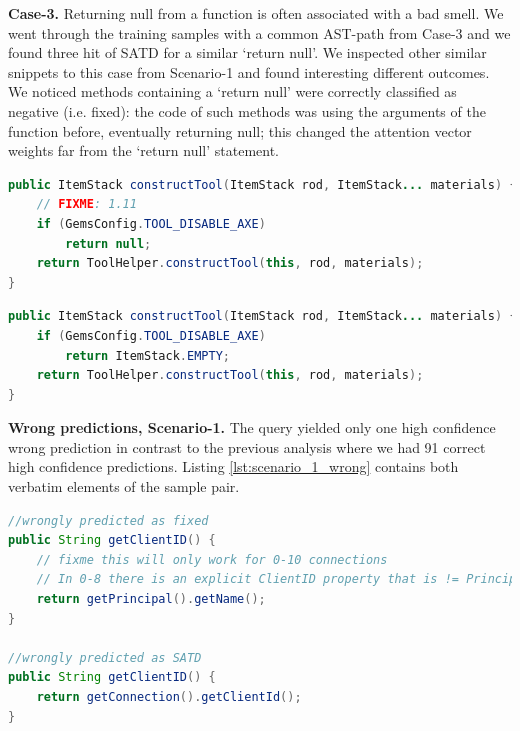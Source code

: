 \textbf{Case-3.} Returning null from a function is often associated with a bad smell. We went through the training samples with a common AST-path from Case-3 and we found three hit of SATD for a similar `return null'. We inspected other similar snippets to this case from Scenario-1 and found interesting different outcomes. We noticed methods containing a `return null' were correctly classified as negative (i.e. fixed): the code of such methods was using the arguments of the function before, eventually returning null; this changed the attention vector weights far from the `return null' statement. 


\begin{lstlisting}[caption={Case-3 SATD, verbatim source code}, label={lst:case3satd},language=Java]
public ItemStack constructTool(ItemStack rod, ItemStack... materials) {
    // FIXME: 1.11
    if (GemsConfig.TOOL_DISABLE_AXE)
        return null;
    return ToolHelper.constructTool(this, rod, materials);
}
\end{lstlisting}

\begin{lstlisting}[caption={Case-3 fixed, verbatim source code}, label={lst:case3fixed},language=Java]
public ItemStack constructTool(ItemStack rod, ItemStack... materials) {
    if (GemsConfig.TOOL_DISABLE_AXE)
        return ItemStack.EMPTY;
    return ToolHelper.constructTool(this, rod, materials);
}
\end{lstlisting}

\textbf{Wrong predictions, Scenario-1.}
The query yielded only one %
high confidence wrong prediction in contrast to the previous analysis where we had 91 correct high confidence predictions. Listing \ref{lst:scenario_1_wrong} contains both verbatim elements of the sample pair.


\begin{lstlisting}[caption={Scenario-1 wrong predictions, verbatim source code}, label={lst:scenario_1_wrong},language=Java]
//wrongly predicted as fixed
public String getClientID() {
    // fixme this will only work for 0-10 connections
    // In 0-8 there is an explicit ClientID property that is != Principal.
    return getPrincipal().getName();
}

//wrongly predicted as SATD
public String getClientID() {
    return getConnection().getClientId();
}
\end{lstlisting}

